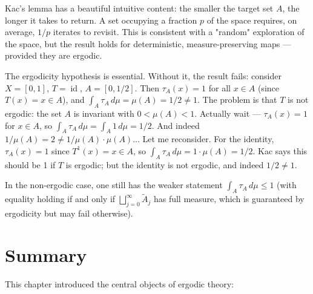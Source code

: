 \begin{remark}
Kac's lemma has a beautiful intuitive content: the smaller the target set $A$, the longer it takes to return. A set occupying a fraction $p$ of the space requires, on average, $1/p$ iterates to revisit. This is consistent with a "random" exploration of the space, but the result holds for deterministic, measure-preserving maps --- provided they are ergodic.
\end{remark}


\begin{remark}
The ergodicity hypothesis is essential. Without it, the result fails: consider $X = [0,1]$, $T = \operatorname{id}$, $A = [0, 1/2]$. Then $\tau_A(x) = 1$ for all $x \in A$ (since $T(x) = x \in A$), and $\int_A \tau_A \, d\mu = \mu(A) = 1/2 \ne 1$. The problem is that $T$ is not ergodic: the set $A$ is invariant with $0 < \mu(A) < 1$. Actually wait --- $\tau_A(x) = 1$ for $x \in A$, so $\int_A \tau_A \, d\mu = \int_A 1 \, d\mu = 1/2$. And indeed $1/\mu(A) = 2 \ne 1/\mu(A) \cdot \mu(A)$... Let me reconsider. For the identity, $\tau_A(x) = 1$ since $T^1(x) = x \in A$, so $\int_A \tau_A \, d\mu = 1 \cdot \mu(A) = 1/2$. Kac says this should be 1 if $T$ is ergodic; but the identity is not ergodic, and indeed $1/2 \ne 1$.
\end{remark}


\begin{remark}
In the non-ergodic case, one still has the weaker statement $\int_A \tau_A \, d\mu \le 1$ (with equality holding if and only if $\bigsqcup_{j=0}^\infty \widetilde{A}_j$ has full measure, which is guaranteed by ergodicity but may fail otherwise).


\bigskip

\end{remark}


\section{Summary}\label{sec:8.6}

This chapter introduced the central objects of ergodic theory:


